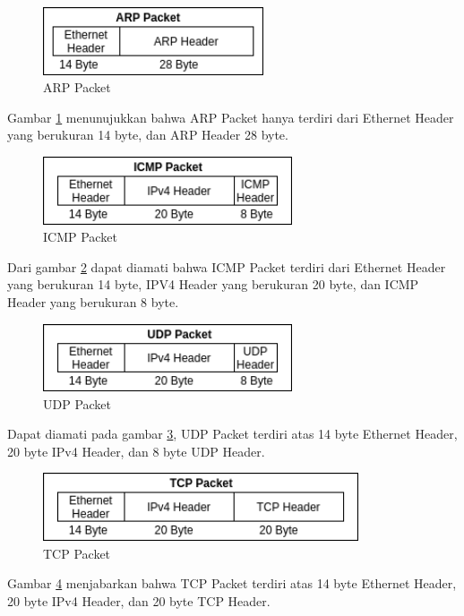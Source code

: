 \documentclass[./skripsi.tex]{subfiles}
\begin{document}
\begin{figure}%
    \centering
    \includegraphics[height=2cm]{public/assets/img/ARPPacket.png}
    \caption{ARP Packet}
    \label{fig:arppaket}
\end{figure}
\par Gambar \ref{fig:arppaket} menunujukkan bahwa ARP Packet hanya terdiri dari Ethernet Header yang berukuran 14 byte, dan ARP Header 28 byte.
\begin{figure}%
    \centering
    \includegraphics[height=2cm]{public/assets/img/ICMPPacket.png}
    \caption{ICMP Packet}
    \label{fig:icmppaket}
\end{figure}
\par Dari gambar \ref{fig:icmppaket} dapat diamati bahwa ICMP Packet terdiri dari Ethernet Header yang berukuran 14 byte, IPV4 Header yang berukuran 20 byte, dan ICMP Header yang berukuran 8 byte.
\begin{figure}%
    \centering
    \includegraphics[height=2cm]{public/assets/img/UDPPacket.png}
    \caption{UDP Packet}
    \label{fig:udppaket}
\end{figure}
\par Dapat diamati pada gambar \ref{fig:udppaket}, UDP Packet terdiri atas 14 byte Ethernet Header, 20 byte IPv4 Header, dan 8 byte UDP Header.
\begin{figure}%
    \centering
    \includegraphics[height=2cm]{public/assets/img/TCPPacket.png}
    \caption{TCP Packet}
    \label{fig:tcppaket}
\end{figure}
\par Gambar \ref{fig:tcppaket} menjabarkan bahwa TCP Packet terdiri atas 14 byte Ethernet Header, 20 byte IPv4 Header, dan 20 byte TCP Header.
\end{document}
